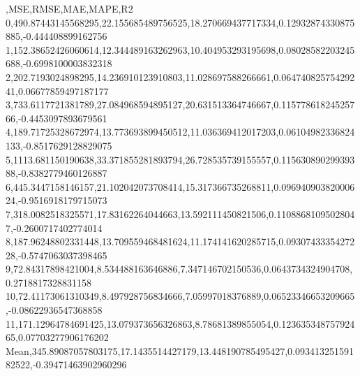 ,MSE,RMSE,MAE,MAPE,R2
0,490.87443145568295,22.155685489756525,18.270669437717334,0.12932874330875885,-0.444408899162756
1,152.38652426060614,12.344489163262963,10.404953293195698,0.08028582203245688,-0.6998100003832318
2,202.7193024898295,14.236910123910803,11.028697588266661,0.06474082575429241,0.06677859497187177
3,733.6117721381789,27.084968594895127,20.631513364746667,0.11577861824525766,-0.4453097893679561
4,189.71725328672974,13.773693899450512,11.036369412017203,0.06104982336824133,-0.8517629128829075
5,1113.681150190638,33.371855281893794,26.728535739155557,0.11563089029939388,-0.8382779460126887
6,445.3447158146157,21.102042073708414,15.317366735268811,0.09694090382000624,-0.9516918179715073
7,318.0082518325571,17.83162264044663,13.592111450821506,0.11088681095028047,-0.2600717402774014
8,187.96248802331448,13.709559468481624,11.174141620285715,0.0930743335427228,-0.5747063037398465
9,72.84317898421004,8.534488163646886,7.347146702150536,0.0643734324904708,0.2718817328831158
10,72.41173061310349,8.497928756834666,7.05997018376889,0.06523346653209665,-0.08622936547368858
11,171.12964784691425,13.079373656326863,8.78681389855054,0.12363534875792465,0.07703277906176202
Mean,345.89087057803175,17.1435514427179,13.448190785495427,0.09341325159182522,-0.39471463902960296
